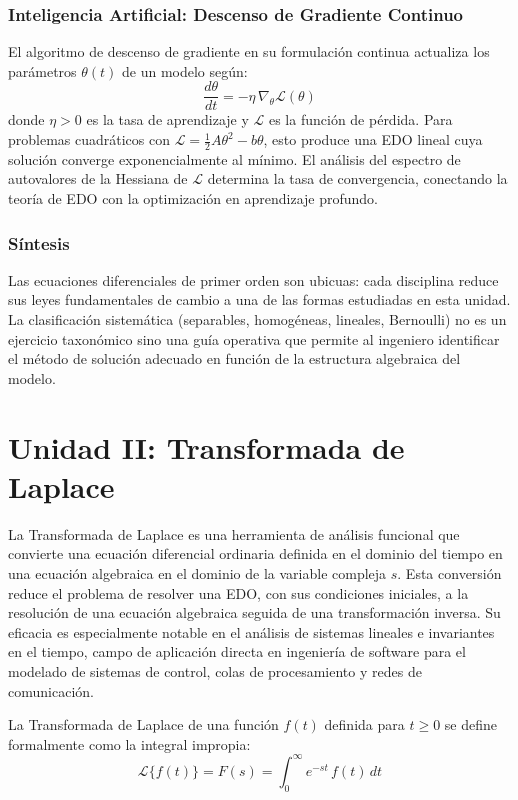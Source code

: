 \documentclass[12pt,letterpaper]{report}
\numberwithin{equation}{chapter}
\numberwithin{figure}{chapter}
\numberwithin{table}{chapter}
\begin{document}
\subsection{Inteligencia Artificial: Descenso de Gradiente Continuo}

El algoritmo de descenso de gradiente en su formulación continua actualiza los parámetros $\theta(t)$ de un modelo según:
\[
\dfrac{d\theta}{dt} = -\eta\,\nabla_{\theta}\mathcal{L}(\theta)
\]
donde $\eta > 0$ es la tasa de aprendizaje y $\mathcal{L}$ es la función de pérdida. Para problemas cuadráticos con $\mathcal{L} = \frac{1}{2}A\theta^2 - b\theta$, esto produce una EDO lineal cuya solución converge exponencialmente al mínimo. El análisis del espectro de autovalores de la Hessiana de $\mathcal{L}$ determina la tasa de convergencia, conectando la teoría de EDO con la optimización en aprendizaje profundo.

\subsection{Síntesis}

Las ecuaciones diferenciales de primer orden son ubicuas: cada disciplina reduce sus leyes fundamentales de cambio a una de las formas estudiadas en esta unidad. La clasificación sistemática (separables, homogéneas, lineales, Bernoulli) no es un ejercicio taxonómico sino una guía operativa que permite al ingeniero identificar el método de solución adecuado en función de la estructura algebraica del modelo.

\chapter{Unidad II: Transformada de Laplace}

La Transformada de Laplace es una herramienta de análisis funcional que convierte una ecuación diferencial ordinaria definida en el dominio del tiempo en una ecuación algebraica en el dominio de la variable compleja $s$. Esta conversión reduce el problema de resolver una EDO, con sus condiciones iniciales, a la resolución de una ecuación algebraica seguida de una transformación inversa. Su eficacia es especialmente notable en el análisis de sistemas lineales e invariantes en el tiempo, campo de aplicación directa en ingeniería de software para el modelado de sistemas de control, colas de procesamiento y redes de comunicación.

La Transformada de Laplace de una función $f(t)$ definida para $t \geq 0$ se define formalmente como la integral impropia:
\begin{equation*}
\mathcal{L}\{f(t)\} = F(s) = \int_{0}^{\infty} e^{-st}\,f(t)\,dt
\end{equation*}
\end{document}
